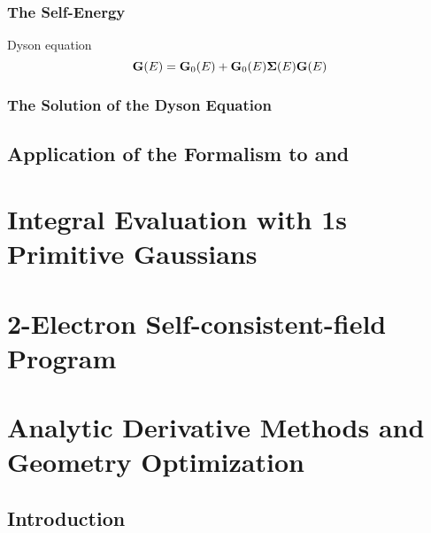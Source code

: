 \documentclass[a4paper]{article}
\numberwithin{equation}{section}
\begin{document}
\subsubsection{The Self-Energy}
Dyson equation
\begin{equation}\label{key}
\vb{G}(E) = \vb{G}_0(E) + \vb{G}_0(E)\bm\Sigma(E)\vb{G}(E)
\end{equation}

\subsubsection{The Solution of the Dyson Equation}

\subsection{Application of the Formalism to  and }






\renewcommand\thesection{\Alph{section}}
\setcounter{section}{0}
\section{Integral Evaluation with 1s Primitive Gaussians}

\section{2-Electron Self-consistent-field Program}

\section{Analytic Derivative Methods and Geometry Optimization}
\subsection{Introduction}
\end{document}
